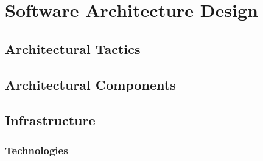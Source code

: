\documentclass[11pt]{article}
\begin{document}
\section{Software Architecture Design}
\subsection{Architectural Tactics}
\subsection{Architectural Components}
\subsection{Infrastructure}
\subsubsection{Technologies}
\end{document}
